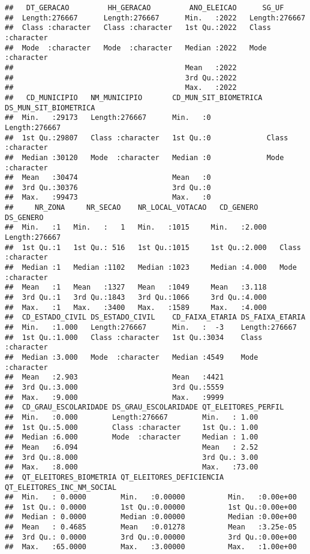 \documentclass[
]{article}
\begin{document}
\begin{verbatim}
##   DT_GERACAO         HH_GERACAO         ANO_ELEICAO      SG_UF          
##  Length:276667      Length:276667      Min.   :2022   Length:276667     
##  Class :character   Class :character   1st Qu.:2022   Class :character  
##  Mode  :character   Mode  :character   Median :2022   Mode  :character  
##                                        Mean   :2022                     
##                                        3rd Qu.:2022                     
##                                        Max.   :2022                     
##   CD_MUNICIPIO   NM_MUNICIPIO       CD_MUN_SIT_BIOMETRICA DS_MUN_SIT_BIOMETRICA
##  Min.   :29173   Length:276667      Min.   :0             Length:276667        
##  1st Qu.:29807   Class :character   1st Qu.:0             Class :character     
##  Median :30120   Mode  :character   Median :0             Mode  :character     
##  Mean   :30474                      Mean   :0                                  
##  3rd Qu.:30376                      3rd Qu.:0                                  
##  Max.   :99473                      Max.   :0                                  
##     NR_ZONA     NR_SECAO    NR_LOCAL_VOTACAO   CD_GENERO      DS_GENERO        
##  Min.   :1   Min.   :   1   Min.   :1015     Min.   :2.000   Length:276667     
##  1st Qu.:1   1st Qu.: 516   1st Qu.:1015     1st Qu.:2.000   Class :character  
##  Median :1   Median :1102   Median :1023     Median :4.000   Mode  :character  
##  Mean   :1   Mean   :1327   Mean   :1049     Mean   :3.118                     
##  3rd Qu.:1   3rd Qu.:1843   3rd Qu.:1066     3rd Qu.:4.000                     
##  Max.   :1   Max.   :3400   Max.   :1589     Max.   :4.000                     
##  CD_ESTADO_CIVIL DS_ESTADO_CIVIL    CD_FAIXA_ETARIA DS_FAIXA_ETARIA   
##  Min.   :1.000   Length:276667      Min.   :  -3    Length:276667     
##  1st Qu.:1.000   Class :character   1st Qu.:3034    Class :character  
##  Median :3.000   Mode  :character   Median :4549    Mode  :character  
##  Mean   :2.903                      Mean   :4421                      
##  3rd Qu.:3.000                      3rd Qu.:5559                      
##  Max.   :9.000                      Max.   :9999                      
##  CD_GRAU_ESCOLARIDADE DS_GRAU_ESCOLARIDADE QT_ELEITORES_PERFIL
##  Min.   :0.000        Length:276667        Min.   : 1.00      
##  1st Qu.:5.000        Class :character     1st Qu.: 1.00      
##  Median :6.000        Mode  :character     Median : 1.00      
##  Mean   :6.094                             Mean   : 2.52      
##  3rd Qu.:8.000                             3rd Qu.: 3.00      
##  Max.   :8.000                             Max.   :73.00      
##  QT_ELEITORES_BIOMETRIA QT_ELEITORES_DEFICIENCIA QT_ELEITORES_INC_NM_SOCIAL
##  Min.   : 0.0000        Min.   :0.00000          Min.   :0.00e+00          
##  1st Qu.: 0.0000        1st Qu.:0.00000          1st Qu.:0.00e+00          
##  Median : 0.0000        Median :0.00000          Median :0.00e+00          
##  Mean   : 0.4685        Mean   :0.01278          Mean   :3.25e-05          
##  3rd Qu.: 0.0000        3rd Qu.:0.00000          3rd Qu.:0.00e+00          
##  Max.   :65.0000        Max.   :3.00000          Max.   :1.00e+00
\end{verbatim}
\end{document}
